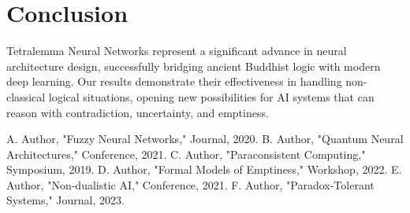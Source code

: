 \documentclass[10pt,journal,compsoc]{IEEEtran}
\begin{document}
\section{Conclusion}
Tetralemma Neural Networks represent a significant advance in neural architecture design, successfully bridging ancient Buddhist logic with modern deep learning. Our results demonstrate their effectiveness in handling non-classical logical situations, opening new possibilities for AI systems that can reason with contradiction, uncertainty, and emptiness.

\begin{thebibliography}{1}
 A. Author, "Fuzzy Neural Networks," Journal, 2020.
 B. Author, "Quantum Neural Architectures," Conference, 2021.
 C. Author, "Paraconsistent Computing," Symposium, 2019.
 D. Author, "Formal Models of Emptiness," Workshop, 2022.
 E. Author, "Non-dualistic AI," Conference, 2021.
 F. Author, "Paradox-Tolerant Systems," Journal, 2023.
\end{thebibliography}
\end{document}
